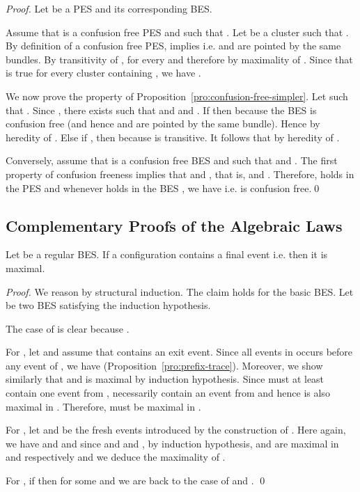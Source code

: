 \documentclass{llncs}
\newcommand{\<}{\langle}
\renewcommand{\>}{\rangle}
\begin{document}
\begin{proof}
Let  be a PES and  its corresponding BES. 

Assume that  is a confusion free PES and  such that . Let  be a cluster such that . By definition of a confusion free PES,  implies  i.e.  and  are pointed by the same bundles. By transitivity of ,  for every  and therefore  by maximality of . Since that is true for every cluster containing , we have .

We now prove the property of Proposition~\ref{pro:confusion-free-simpler}. Let  such that . Since , there exists  such that  and  and . If  then  because the BES is confusion free (and hence  and  are pointed by the same bundle). Hence  by heredity of . Else if , then  because  is transitive. It follows that  by heredity of . 

Conversely, assume that  is a confusion free BES and  such that  and . The first property of confusion freeness implies that  and , that is,  and . Therefore,  holds in the PES  and whenever  holds in the BES , we have  i.e.  is confusion free.\qed
\end{proof}

\subsection{Complementary Proofs of the Algebraic Laws}

\begin{proposition}\label{pro:exit-maximal}
Let  be a regular BES. If a configuration  contains a final event i.e.  then it is maximal. 
\end{proposition}

\begin{proof}
We reason by structural induction. The claim holds for the basic BES. Let  be two BES satisfying the induction hypothesis. 

The case of  is clear because . 

For , let  and assume that  contains an exit event. Since all events in  occurs before any event of , we have  (Proposition~\ref{pro:prefix-trace}). Moreover, we show similarly that   and is maximal by induction hypothesis. Since  must at least contain one event from ,  necessarily contain an event from  and hence  is also maximal in . Therefore,  must be maximal in . 

For , let  and   be the fresh events introduced by the construction of . Here again, we have  and  and since  and  and , by induction hypothesis,  and  are maximal in  and  respectively and we deduce the maximality of .

For , if  then  for some  and we are back to the case of  and . \qed
\end{proof}
\end{document}
